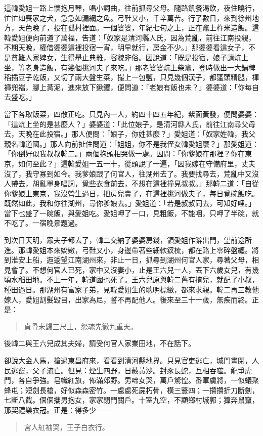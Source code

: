 這韓愛姐一路上懷抱月琴，唱小詞曲，往前抓尋父母。隨路飢餐渴飲，夜住曉行，忙忙如喪家之犬，急急如漏網之魚。弓鞋又小，千辛萬苦。行了數日，來到徐州地方，天色晚了，投在孤村裡面。一個婆婆，年紀七旬之上，正在竈上杵米造飯。這韓愛姐便向前道了萬福，告道：「奴家是清河縣人氏，因為荒亂，前往江南投親，不期天晚，權借婆婆這裡投宿一宵，明早就行，房金不少。」那婆婆看這女子，不是貧難人家婢女，生得舉止典雅，容貌非俗。因說道：「既是投宿，娘子請炕上坐，等老身造飯，有幾個挑河夫子來吃。」那老婆婆炕上柴竈，登時做出一大鍋稗稻插豆子乾飯，又切了兩大盤生菜，撮上一包鹽，只見幾個漢子，都蓬頭精腿，褌褲兜襠，腳上黃泥，進來放下鍬钁，便問道：「老娘有飯也未？」婆婆道：「你每自去盛吃。」

當下各取飯菜，四散正吃。只見內一人，約四十四五年紀，紫面黃發，便問婆婆：「這炕上坐的是甚麼人？」婆婆道：「此位娘子，是清河縣人氏，前往江南尋父母去，天晚在此投宿。」那人便問：「娘子，你姓甚麼？」愛姐道：「奴家姓韓，我父親名韓道國。」那人向前扯住問道：「姐姐，你不是我侄女韓愛姐麼？」那愛姐道：「你倒好似我叔叔韓二。」兩個抱頭相哭做一處。因問：「你爹娘在那裡？你在東京，如何至此？」這韓愛姐一五一十，從頭說了一遍，「因我嫁在守備府里，丈夫沒了，我守寡到如今。我爹娘跟了何官人，往湖州去了。我要找尋去，荒亂中又沒人帶去，胡亂單身唱詞，覓些衣食前去，不想在這裡撞見叔叔。」那韓二道：「自從你爹娘上東京，我沒營生過日，把房兒賣了，在這裡挑河做夫子，每日覓碗飯吃。既然如此，我和你往湖州，尋你爹娘去。」愛姐道：「若是叔叔同去，可知好哩。」當下也盛了一碗飯，與愛姐吃。愛姐呷了一口，見粗飯，不能咽，只呷了半碗，就不吃了。一宿晚景題過。

到次日天明，眾夫子都去了，韓二交納了婆婆房錢，領愛姐作辭出門，望前途所進。那韓愛姐本來嬌嫩，弓鞋又小，身邊帶著些細軟釵梳，都在路上零碎盤纏。將到淮安上船，迤逶望江南湖州來，非止一日，抓尋到湖州何官人家，尋著父母，相見會了。不想何官人已死，家中又沒妻小，止是王六兒一人，丟下六歲女兒，有幾頃水稻田地。不上一年，韓道國也死了。王六兒原與韓二舊有揸兒，就配了小叔，種田過日。那湖州有富家子弟，見韓愛姐生的聰明標緻，都來求親。韓二再三教他嫁人，愛姐割髮毀目，出家為尼，誓不再配他人。後來至三十一歲，無疾而終。正是：
\begin{quote}
貞骨未歸三尺土，怨魂先徹九重天。
\end{quote}

後韓二與王六兒成其夫婦，請受何官人家業田地，不在話下。

卻說大金人馬，搶過東昌府來，看看到清河縣地界。只見官吏逃亡，城門晝閉，人民逃竄，父子流亡。但見：煙生四野，日蔽黃沙。封豕長蛇，互相吞噬。龍爭虎鬥，各自爭強。皂幟紅旗，佈滿郊野。男啼女哭，萬戶驚惶。番軍虜將，一似蟻聚蜂屯；短劍長槍，好似森森密竹。一處處死屍朽骨，橫三豎四；一攢攢折刀斷劍，七斷八截。個個攜男抱女，家家閉門關戶。十室九空，不顯鄉村城郭；獐奔鼠竄，那契禮樂衣冠。正是：得多少——
\begin{quote}
宮人紅袖哭，王子白衣行。
\end{quote}

